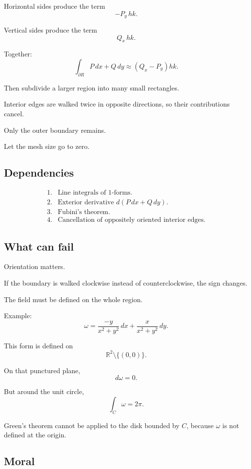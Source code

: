 Horizontal sides produce the term
\[
    -P_y\,hk.
\]

Vertical sides produce the term
\[
    Q_x\,hk.
\]

Together:
\[
    \int_{\partial R}P\,dx+Q\,dy
    \approx
    (Q_x-P_y)hk.
\]

Then subdivide a larger region into many small rectangles.

Interior edges are walked twice in opposite directions, so their contributions cancel.

Only the outer boundary remains.

Let the mesh size go to zero.

\subsection*{Dependencies}

\[
\begin{array}{ll}
1. & \text{Line integrals of \(1\)-forms.}\\[1mm]
2. & \text{Exterior derivative }d(P\,dx+Q\,dy).\\[1mm]
3. & \text{Fubini's theorem.}\\[1mm]
4. & \text{Cancellation of oppositely oriented interior edges.}
\end{array}
\]

\subsection*{What can fail}

Orientation matters.

If the boundary is walked clockwise instead of counterclockwise, the sign changes.

The field must be defined on the whole region.

Example:
\[
    \omega=
    \frac{-y}{x^2+y^2}\,dx
    +
    \frac{x}{x^2+y^2}\,dy.
\]

This form is defined on
\[
    \mathbb R^2\setminus\{(0,0)\}.
\]

On that punctured plane,
\[
    d\omega=0.
\]

But around the unit circle,
\[
    \int_{C}\omega=2\pi.
\]

Green's theorem cannot be applied to the disk bounded by \(C\), because \(\omega\) is
not defined at the origin.

\subsection*{Moral}

